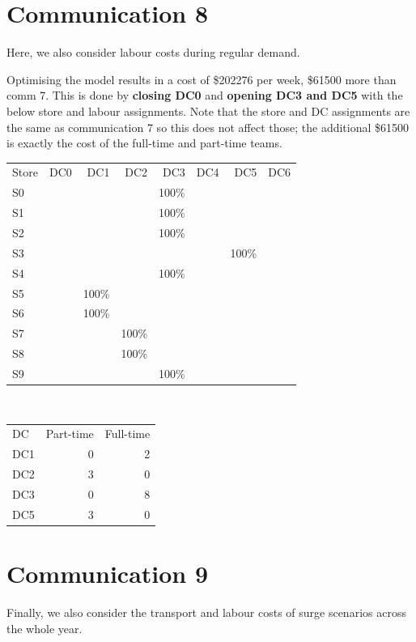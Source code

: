 \documentclass[11pt,a4paper]{article}
\begin{document}
\newpage

\section{Communication 8}
Here, we also consider labour costs during regular demand.

Optimising the model results in a cost of \$202276 per week, \$61500 more than 
comm 7. This is done by \textbf{closing DC0} and 
\textbf{opening DC3 and DC5} with the below store and labour assignments. 
Note that the store and DC assignments are the same as 
communication 7 so this does not affect those; the additional \$61500
is exactly the cost of the full-time and part-time teams.
\\[0.8em]
\begin{tabular}{l  r  r  r  r r r r}
    Store & DC0 & DC1 & DC2 & DC3 & DC4 & DC5 & DC6 \\
    S0 &  &  &  & 100\% &  &  &  \\
    S1 &  &  &  & 100\% &  &  &  \\
    S2 &  &  &  & 100\% &  &  &  \\
    S3 &  &  &  &  &  & 100\% &  \\
    S4 &  &  &  & 100\% &  &  &  \\
    S5 &  & 100\% &  &  &  &  &  \\
    S6 &  & 100\% &  &  &  &  &  \\
    S7 &  &  & 100\% &  &  &  &  \\
    S8 &  &  & 100\% &  &  &  &  \\
    S9 &  &  &  & 100\% &  &  &  \\
\end{tabular} \\ [0.8em]
\begin{tabular}{l  r  r }
    DC & Part-time & Full-time \\
    DC1 & 0 &2 \\ 
    DC2  & 3 &0 \\ 
    DC3 &  0& 8 \\
    DC5 &  3&0 \\ 
\end{tabular}

\newpage
\section{Communication 9}
Finally, we also consider the transport and labour costs of 
surge scenarios across the whole year. 
\end{document}
